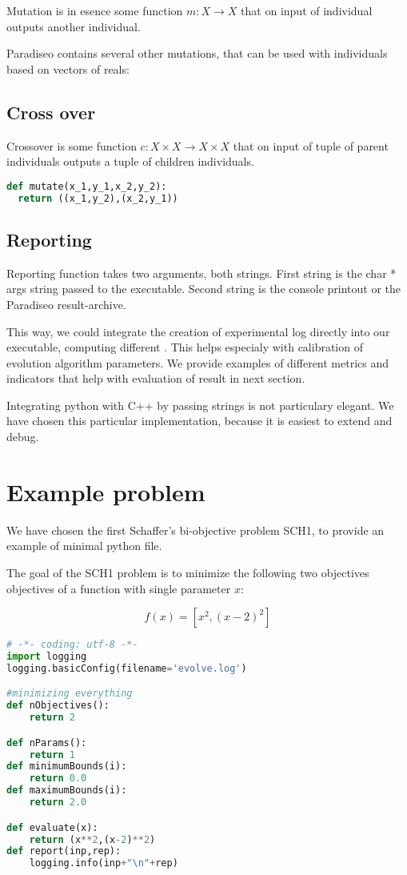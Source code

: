 \documentclass[12pt,oneside]{fithesis2}
\begin{document}
Mutation is in esence some function $m:X \to X$ that on input of individual outputs another individual.

Paradiseo contains several other mutations, that can be used with individuals based on vectors of reals:

\subsection{Cross over}
Crossover is some function $c:X \times X \to X \times X$ that on input of tuple of parent individuals outputs a tuple of children individuals. 
\begin{lstlisting}[language=Python,label=cross_example,caption=Crossover example]
def mutate(x_1,y_1,x_2,y_2):
  return ((x_1,y_2),(x_2,y_1))
\end{lstlisting}

\subsection{Reporting}

Reporting function takes two arguments, both strings. First string is the char * args string passed to the executable. Second string is the console printout or the Paradiseo result-archive.

This way, we could integrate the creation of experimental log directly into our executable, computing different . This helps especialy with calibration of evolution algorithm parameters.
We provide examples of different metrics and indicators that help with evaluation of result in next section.

Integrating python with C++ by passing strings is not particulary elegant. We have chosen this particular implementation, because it is easiest to extend and debug.

\section{Example problem}

We have chosen the first Schaffer's bi-objective problem SCH1, to provide an example of minimal python file.

The goal of the SCH1 problem is to minimize the following two objectives objectives of a function with single parameter $x$:

$$f(x) = [x^2,(x-2)^2]$$

\begin{lstlisting}[language=Python,label=min_example,caption=Minimal working example]
# -*- coding: utf-8 -*-
import logging
logging.basicConfig(filename='evolve.log')

#minimizing everything 
def nObjectives():
	return 2

def nParams():
	return 1
def minimumBounds(i):
	return 0.0
def maximumBounds(i):
	return 2.0

def evaluate(x):
	return (x**2,(x-2)**2)
def report(inp,rep):
	logging.info(inp+"\n"+rep) 
\end{lstlisting}
\end{document}
